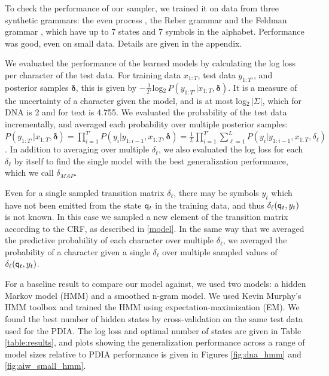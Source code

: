 To check the performance of our sampler, we trained it on data from three synthetic grammars: the even process \cite{?}, the Reber grammar \cite{Reber} and the Feldman grammar \cite{Feldman}, which have up to 7 states and 7 symbols in the alphabet.  Performance was good, even on small data.  Details are given in the appendix.

We evaluated the performance of the learned models by calculating the log loss per character of the test data.  For training data $x_{1:T}$, test data $y_{1:T'}$, and posterior samples $\boldsymbol\delta$, this is given by $-\frac{1}{T'}$log$_2\, P(y_{1:T'}|x_{1:T},\boldsymbol\delta)$.  It is a measure of the uncertainty of a character given the model, and is at most log$_2\,|\Sigma|$, which for DNA is 2 and for text is 4.755.  We evaluated the probability of the test data incrementally, and averaged each probability over multiple posterior samples: $P(y_{1:T'}|x_{1:T},\boldsymbol\delta) = \prod_{i = 1}^{T'} P(y_i|y_{1:i-1},x_{1:T},\boldsymbol\delta) = \frac{1}{L}\prod_{i = 1}^{T'} \sum_{\ell = 1}^{L} P(y_i|y_{1:i-1},x_{1:T},\delta_\ell)$.  In addition to averaging over multiple $\delta_\ell$, we also evaluated the log loss for each $\delta_\ell$ by itself to find the single model with the best generalization performance, which we call $\delta_{MAP}$.

Even for a single sampled transition matrix $\delta_\ell$, there may be symbols $y_t$ which have not been emitted from the state $\q_t$ in the training data, and thus $\delta_\ell(\q_t,y_t)$ is not known.  In this case we sampled a new element of the transition matrix according to the CRF, as described in \ref{model}.  In the same way that we averaged the predictive probability of each character over multiple $\delta_\ell$, we averaged the probability of a character given a single $\delta_\ell$ over multiple sampled values of $\delta_\ell(\q_t,y_t)$.

For a baseline result to compare our model against, we used two models: a hidden Markov model (HMM) and a smoothed n-gram model.  We used Kevin Murphy's HMM toolbox \cite{Murphy} and trained the HMM using expectation-maximization (EM).  We found the best number of hidden states by cross-validation on the same test data used for the PDIA.  The log loss and optimal number of states are given in Table \ref{table:results}, and plots showing the generalization performance across a range of model sizes relative to PDIA performance is given in Figures \ref{fig:dna_hmm} and \ref{fig:aiw_small_hmm}.  

